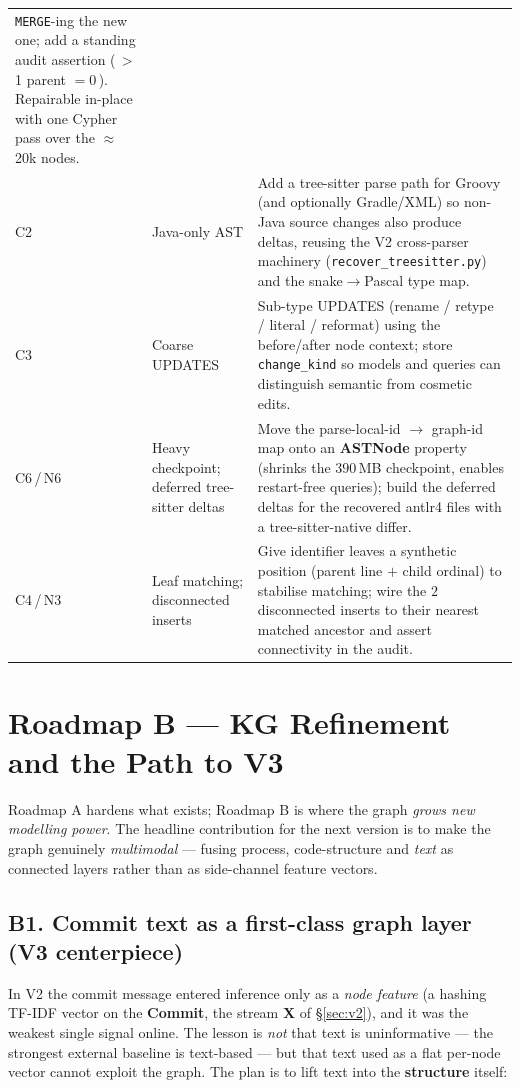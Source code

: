 \documentclass[11pt,a4paper]{article}
\newcommand{\code}[1]{\texttt{#1}}
\newcommand{\node}[1]{\textcolor{kgblue}{\textbf{#1}}}
\newcommand{\edge}[1]{\textsc{#1}}
\begin{document}
\begin{longtable}{@{}p{0.9cm}p{5.2cm}p{8.4cm}@{}}
	\texttt{MERGE}-ing the new one; add a standing audit assertion (\,$>$1 parent
	$=0$\,). Repairable in-place with one Cypher pass over the $\approx$20k nodes.\\
	\addlinespace
	C2 & Java-only AST &
	Add a tree-sitter parse path for Groovy (and optionally Gradle/XML) so non-Java
	source changes also produce deltas, reusing the V2 cross-parser machinery
	(\texttt{recover\_treesitter.py}) and the snake$\rightarrow$Pascal type map.\\
	\addlinespace
	C3 & Coarse \edge{UPDATES} &
	Sub-type \edge{UPDATES} (rename / retype / literal / reformat) using the
	before/after node context; store \code{change\_kind} so models and queries can
	distinguish semantic from cosmetic edits.\\
	\addlinespace
	C6\,/\,N6 & Heavy checkpoint; deferred tree-sitter deltas &
	Move the parse-local-id $\rightarrow$ graph-id map onto an \node{ASTNode} property
	(shrinks the $390$\,MB checkpoint, enables restart-free queries); build the deferred
	deltas for the recovered antlr4 files with a tree-sitter-native differ.\\
	\addlinespace
	C4\,/\,N3 & Leaf matching; disconnected inserts &
	Give identifier leaves a synthetic position (parent line $+$ child ordinal) to
	stabilise matching; wire the $2$ disconnected inserts to their nearest matched
	ancestor and assert connectivity in the audit.\\
	\bottomrule
	\end{longtable}

	\section{Roadmap B --- KG Refinement and the Path to V3}\label{sec:roadmapB}
	Roadmap A hardens what exists; Roadmap B is where the graph \emph{grows new
	modelling power}. The headline contribution for the next version is to make the
	graph genuinely \emph{multimodal} --- fusing process, code-structure and
	\emph{text} as connected layers rather than as side-channel feature vectors.

	\subsection{B1. Commit text as a first-class graph layer (V3 centerpiece)}
	\label{sec:textlayer}
	In V2 the commit message entered inference only as a \emph{node feature} (a hashing
	TF-IDF vector on the \node{Commit}, the stream \textbf{X} of \S\ref{sec:v2}), and it
	was the weakest single signal online. The lesson is \emph{not} that text is
	uninformative --- the strongest external baseline is text-based --- but that text
	used as a flat per-node vector cannot exploit the graph. The plan is to lift text
	into the \textbf{structure} itself:
\end{document}

